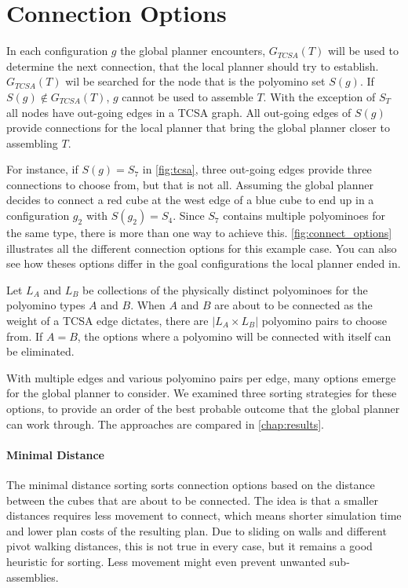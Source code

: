 \section{Connection Options}
\label{sec:connect_options}

In each configuration $g$ the global planner encounters, $G_{TCSA}(T)$ will be used to determine the next connection, that the local planner should try to establish.
$G_{TCSA}(T)$ wil be searched for the node that is the polyomino set $S(g)$.
If $S(g) \notin G_{TCSA}(T)$, $g$ cannot be used to assemble $T$.
With the exception of $S_T$ all nodes have out-going edges in a TCSA graph.
All out-going edges of $S(g)$ provide connections for the local planner that bring the global planner closer to assembling $T$.

For instance, if $S(g) = S_7$ in \autoref{fig:tcsa}, three out-going edges provide three connections to choose from, but that is not all.
Assuming the global planner decides to connect a red cube at the west edge of a blue cube to end up in a configuration $g_2$ with $S(g_2) = S_4$.
Since $S_7$ contains multiple polyominoes for the same type, there is more than one way to achieve this.
\autoref{fig:connect_options} illustrates all the different connection options for this example case.
You can also see how theses options differ in the goal configurations the local planner ended in.

Let $L_A$ and $L_B$ be collections of the physically distinct polyominoes for the polyomino types $A$ and $B$.
When $A$ and $B$ are about to be connected as the weight of a TCSA edge dictates, there are $\left| L_A \times L_B \right|$ polyomino pairs to choose from.
If $A = B$, the options where a polyomino will be connected with itself can be eliminated.

With multiple edges and various polyomino pairs per edge, many options emerge for the global planner to consider.
We examined three sorting strategies for these options, to provide an order of the best probable outcome that the global planner can work through. 
The approaches are compared in \autoref{chap:results}.

\paragraph{Minimal Distance}

The minimal distance sorting sorts connection options based on the distance between the cubes that are about to be connected.
The idea is that a smaller distances requires less movement to connect, which means shorter simulation time and lower plan costs of the resulting plan.
Due to sliding on walls and different pivot walking distances, this is not true in every case, but it remains a good heuristic for sorting.
Less movement might even prevent unwanted sub-assemblies.

